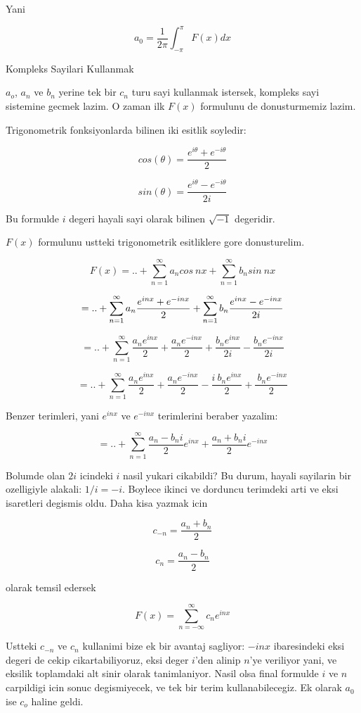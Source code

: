 \documentclass[12pt,fleqn]{article}
\begin{document}
Yani

\[ a_0 = \frac{1}{2\pi}\int_{-\pi}^{\pi}F(x)dx \]

Kompleks Sayilari Kullanmak

$a_o$, $a_n$ ve $b_n$ yerine tek bir $c_n$ turu sayi kullanmak istersek,
kompleks sayi sistemine gecmek lazim. O zaman ilk $F(x)$ formulunu de
donusturmemiz lazim.

Trigonometrik fonksiyonlarda bilinen iki esitlik soyledir:

\[ cos(\theta) = \frac{e^{i\theta}+e^{-i\theta}}{2} \]

\[ sin(\theta) = \frac{e^{i\theta}-e^{-i\theta}}{2i}  \]

Bu formulde $i$ degeri hayali sayi olarak bilinen $\sqrt{-1}$ degeridir. 

$F(x)$ formulunu ustteki trigonometrik esitliklere gore donusturelim. 

\[ F(x) = .. +  \sum_{n=1}^{\infty}a_ncos \ nx + \sum_{n=1}^{\infty}b_nsin \ nx \]

\[ = .. + \sum_{n=1}^{\infty} a_n \frac{e^{inx} + e^{-inx}}{2} +  \sum_{n=1}^{\infty} b_n \frac{e^{inx} - e^{-inx}}{2i}\\ \]

\[ = .. + \sum_{n=1}^{\infty} \frac{a_ne^{inx}}{2} + \frac{a_ne^{-inx}}{2} +
\frac{b_ne^{inx}}{2i} - \frac{b_ne^{-inx}}{2i} \]

\[ = .. + \sum_{n=1}^{\infty} \frac{a_ne^{inx}}{2} + \frac{a_ne^{-inx}}{2} -
\frac{i \ b_ne^{inx}}{2} + \frac{ \ b_ne^{-inx}}{2} \]

Benzer terimleri, yani $e^{inx}$ ve $e^{-inx}$ terimlerini beraber yazalim:

\[ = .. + \sum_{n=1}^{\infty} \frac{a_n-b_ni}{2}e^{inx} + \frac{a_n+b_ni}{2}e^{-inx} \]

Bolumde olan $2i$ icindeki $i$ nasil yukari cikabildi? Bu durum, hayali
sayilarin bir ozelligiyle alakali: $1/i = -i$. Boylece ikinci ve dorduncu
terimdeki arti ve eksi isaretleri degismis oldu. Daha kisa yazmak icin

\[ c_{-n} = \frac{a_n + b_n}{2} \]

\[ c_{n} = \frac{a_n - b_n}{2} \]

olarak temsil edersek

\begin{equation} F(x) = \sum_{n=-\infty}^{\infty} c_ne^{inx} \label{complexfourier} \end{equation}

Ustteki $c_{-n}$ ve $c_n$ kullanimi bize ek bir avantaj sagliyor: $-inx$
ibaresindeki eksi degeri de cekip cikartabiliyoruz, eksi deger $i$'den alinip
$n$'ye veriliyor yani, ve eksilik toplamdaki alt sinir olarak
tanimlaniyor. Nasil olsa final formulde $i$ ve $n$ carpildigi icin sonuc
degismiyecek, ve tek bir terim kullanabilecegiz. Ek olarak $a_0$ ise $c_o$
haline geldi.
\end{document}
